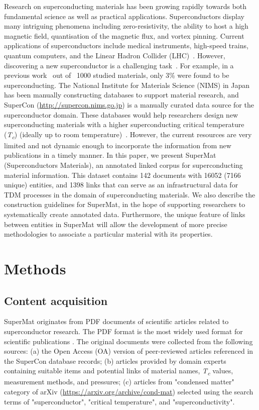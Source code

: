 \documentclass[]{interact}
\theoremstyle{plain}%
\theoremstyle{definition}
\theoremstyle{remark}
\begin{document}
Research on superconducting materials has been growing rapidly towards both fundamental science as well as practical applications. Superconductors display many intriguing phenomena including zero-resistivity, the ability to host a high magnetic field, quantisation of the magnetic flux, and vortex pinning.  
Current applications of superconductors include medical instruments, high-speed trains, quantum computers, and the Linear Hadron Collider (LHC)~\cite{PhilippeBook, Kizu2010ConstructionOT, Cardani2017NewAO}. 
However, discovering a new superconductor is a challenging task~\cite{PhysRevB.103.014509}. For example, in a previous work~\cite{doi:10.1088/1468-6996/16/3/033503} out of ~1000 studied materials, only 3\% were found to be superconducting. 
The National Institute for Materials Science (NIMS) in Japan has been manually constructing databases to support material research, and SuperCon (\url{http://supercon.nims.go.jp}) is a manually curated data source for the superconductor domain.
These databases would help researchers design new superconducting materials with a higher superconducting critical temperature (\textit{T\textsubscript{c}}) (ideally up to room temperature)~\cite{Hamlin2019SuperconductivityNR,stanev2017machine}.
However, the current resources are very limited and not dynamic enough to incorporate the information from new publications in a timely manner. 
In this paper, we present SuperMat (Superconductors Materials), an annotated linked corpus for superconducting material information. 
This dataset contains 142 documents with 16052 (7166 unique) entities, and 1398 links that can serve as an infrastructural data for TDM processes in the domain of superconducting materials. 
We also describe the construction guidelines for SuperMat, in the hope of supporting researchers to systematically create annotated data.
Furthermore, the unique feature of links between entities in SuperMat will allow the development of more precise methodologies to associate a particular material with its properties.

\label{sec:method}
\section{Methods}

\label{content-acquisition}
\subsection{Content acquisition}
SuperMat originates from PDF documents of scientific articles related to superconductor research. 
The PDF format is the most widely used format for scientific publications \cite{johnson2018pdfStatistics}.
The original documents were collected from the following sources: (a) the Open Access (OA) version of peer-reviewed articles referenced in the SuperCon database records; 
(b) articles provided by domain experts containing suitable items and potential links of material names, \textit{T\textsubscript{c}} values, measurement methods, and pressures; (c) articles from "condensed matter" category of arXiv (\url{https://arxiv.org/archive/cond-mat}) selected using the search terms of "superconductor", "critical temperature", and "superconductivity". 
\end{document}
